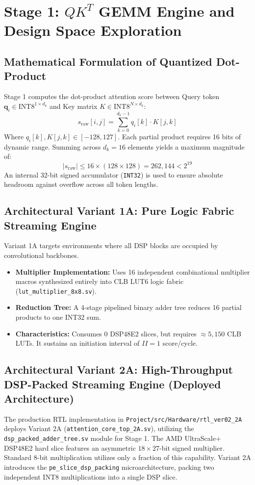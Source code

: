 \chapter{Stage 1: $QK^T$ GEMM Engine and Design Space Exploration}
\label{chap:stage1_gemm}

\section{Mathematical Formulation of Quantized Dot-Product}
Stage 1 computes the dot-product attention score between Query token $\mathbf{q}_i \in \text{INT8}^{1 \times d_k}$ and Key matrix $K \in \text{INT8}^{N \times d_k}$:
\begin{equation}
    s_{\text{raw}}[i, j] = \sum_{k=0}^{d_k-1} q_i[k] \cdot K[j, k]
\end{equation}
Where $q_i[k], K[j, k] \in [-128, 127]$. Each partial product requires 16 bits of dynamic range. Summing across $d_k = 16$ elements yields a maximum magnitude of:
\begin{equation}
    |s_{\text{raw}}| \le 16 \times (128 \times 128) = 262,144 < 2^{19}
\end{equation}
An internal 32-bit signed accumulator (\texttt{INT32}) is used to ensure absolute headroom against overflow across all token lengths.

\section{Architectural Variant 1A: Pure Logic Fabric Streaming Engine}
Variant 1A targets environments where all DSP blocks are occupied by convolutional backbones.
\begin{itemize}
    \item \textbf{Multiplier Implementation:} Uses 16 independent combinational multiplier macros synthesized entirely into CLB LUT6 logic fabric (\texttt{lut\_multiplier\_8x8.sv}).
    \item \textbf{Reduction Tree:} A 4-stage pipelined binary adder tree reduces 16 partial products to one INT32 sum.
    \item \textbf{Characteristics:} Consumes 0 DSP48E2 slices, but requires $\approx 5,150$ CLB LUTs. It sustains an initiation interval of $II = 1$ score/cycle.
\end{itemize}

\section{Architectural Variant 2A: High-Throughput DSP-Packed Streaming Engine (Deployed Architecture)}
The production RTL implementation in \texttt{Project/src/Hardware/rtl_ver02_2A} deploys Variant 2A (\texttt{attention\_core\_top\_2A.sv}), utilizing the \texttt{dsp\_packed\_adder\_tree.sv} module for Stage 1. The AMD UltraScale+ DSP48E2 hard slice features an asymmetric $18 \times 27$-bit signed multiplier. Standard 8-bit multiplication utilizes only a fraction of this capability. Variant 2A introduces the \texttt{pe\_slice\_dsp_packing} microarchitecture, packing two independent INT8 multiplications into a single DSP slice.

